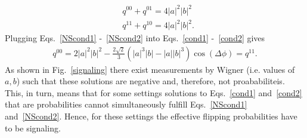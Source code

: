 \documentclass[a4paper,twocolumn,11pt,accepted=2017-05-09,dvipsnames]{quantumarticle}
\numberwithin{equation}{section}
\begin{document}
\begin{appendix}
\begin{align}
\label{NScond1}
&q^{00}+q^{01}=4|a|^2|b|^2 \\
\label{NScond2}
&q^{11}+q^{10}=4|a|^2|b|^2. 
\end{align}
Plugging Eqs.~\eqref{NScond1} -~\eqref{NScond2} into Eqs.~\eqref{cond1} -~\eqref{cond2} gives
\begin{align}
\label{Condi}
q^{00}=2|a|^2|b|^2-\frac{2\sqrt{2}}{3}(|a|^3|b|-|a| |b|^3)\cos(\Delta\phi)=q^{11}.
\end{align}
As shown in Fig.~\ref{signaling} there exist measurements by Wigner (i.e. values of $a,b$) such that these solutions are negative and, therefore, not proababiliteis. This, in turn, means that for some settings solutions to Eqs.~\eqref{cond1} and~\eqref{cond2} that are probabilities cannot simultaneously fulfill Eqs.~\eqref{NScond1} and~\eqref{NScond2}. Hence, for these settings the effective flipping probabilities have to be signaling. \\


\end{appendix}
\end{document}
